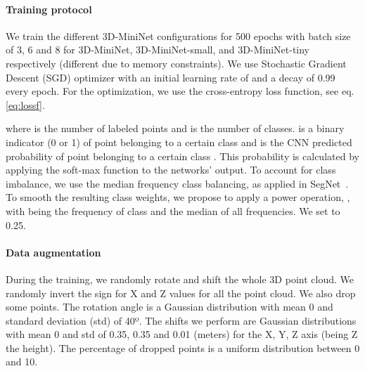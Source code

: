 \documentclass[letterpaper, 10 pt, journal, twoside]{IEEEtran}
\begin{document}
\paragraph{Training protocol}
We train the different 3D-MiniNet configurations for 500 epochs with batch size of 3, 6 and  8 for 3D-MiniNet, 3D-MiniNet-small, and 3D-MiniNet-tiny respectively (different due to memory constraints). 
We use Stochastic Gradient Descent (SGD) optimizer with an initial learning rate of  and a  decay of  0.99 every epoch.
For the optimization, we use the cross-entropy loss function, see eq. \ref{eq:lossf}.




\noindent where  is the number of labeled points and  is the number of classes.  is a binary indicator (0 or 1) of point  belonging to a certain class   and  is the CNN predicted probability of point  belonging to a certain class . This probability is calculated by applying the soft-max function to the networks' output. 
To account for class imbalance, we use the median frequency class balancing, as applied in SegNet~\cite{badrinarayanan2017segnet}. To smooth the resulting class weights, we propose to apply a power operation, , 
with  being the frequency of class  and  the median of all frequencies. We set  to 0.25.

 
\paragraph{Data augmentation}
During the training, we randomly rotate and shift the whole  3D point cloud. We randomly invert the sign for X and Z values for all the point cloud. We also drop some points.
The rotation angle is a Gaussian distribution with mean 0 and standard deviation  (std) of 40º.  The shifts we perform are Gaussian distributions with mean 0 and std of 0.35, 0.35 and 0.01 (meters) for the X, Y, Z axis (being Z the height).
The percentage of dropped points is a uniform distribution between 0 and 10.
\end{document}
